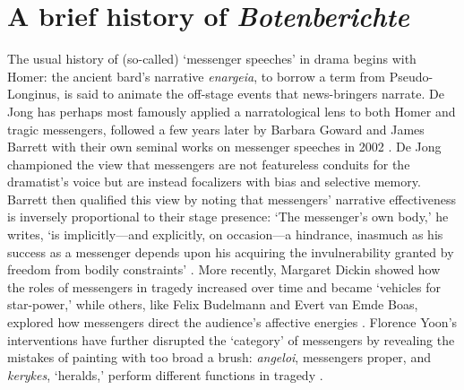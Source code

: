 \documentclass[
]{ceurart}
\begin{document}
\section{A brief history of \textit{Botenberichte}}

The usual history of (so-called) `messenger speeches' in drama begins with
Homer: the ancient bard's narrative \textit{enargeia}, to borrow a term from
Pseudo-Longinus, is said to animate the off-stage events that news-bringers
narrate. De Jong has perhaps most famously applied a narratological lens to
both Homer and tragic messengers, followed a few years later by Barbara
Goward and James Barrett with their own seminal works on messenger speeches
in 2002 \cite{deJong2011, deJong1991, Goward1999, Barrett2002}. De Jong
championed the view that messengers are not featureless conduits for the
dramatist's voice but are instead focalizers with bias and selective memory.
Barrett then qualified this view by noting that messengers' narrative
effectiveness is inversely proportional to their stage presence: `The
messenger's own body,' he writes, `is implicitly—and explicitly, on
occasion—a hindrance, inasmuch as his success as a messenger depends upon his
acquiring the invulnerability granted by freedom from bodily
constraints' \cite[100]{Barrett2002}. More recently, Margaret Dickin showed
how the roles of messengers in tragedy increased over time and became
`vehicles for star-power,' while others, like Felix Budelmann and Evert van
Emde Boas, explored how messengers direct the audience's affective
energies \cite{Dickin2009, Budelmann.vanEmdeBoas2020}. Florence Yoon's
interventions have further disrupted the `category' of messengers by
revealing the mistakes of painting with too broad a brush:
\textit{angeloi}, messengers proper, and \textit{kerykes}, `heralds,'
perform different functions in tragedy \cite{Yoon2022}.
\end{document}
